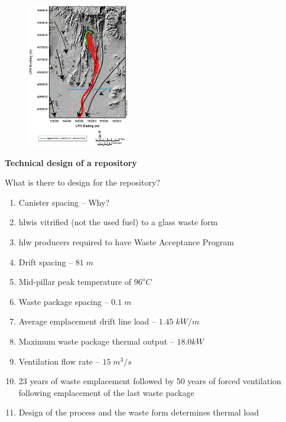 \documentclass[aspectratio=1610,pdftex,dvipsnames,compress,xcolor={dvipsnames}]{beamer}
\newcommand{\acs}{\acrshort} %
\begin{document}
\begin{frame}{}
    \begin{figure}
        \centering
        \includegraphics[width=0.40\textwidth]{groundwater.flow.jpg}
    \end{figure}
\end{frame}


\begin{frame}[plain]{}
    \centering\Large\textbf{Technical design of a repository}
\end{frame}


\addtocounter{framenumber}{-1} 
\begin{frame}{What is there to design for the repository?}
    \begin{enumerate}[series=outerlist,topsep=0pt,itemsep=7pt,leftmargin=*,label=(\arabic*)]
        \item[]Canister spacing -- Why?
        \item[]\acs{hlw}is vitrified (not the used fuel) to a glass waste form
        \item[]\acs{hlw} producers required to have Waste Acceptance Program 
        \item[]Drift spacing -- $81 \; m$
        \item[]Mid-pillar peak temperature of $96^oC$
        \item[]Waste package spacing -- $0.1 \; m$
        \item[]Average emplacement drift line load -- $1.45 \; kW/m$
        \item[]Maximum waste package thermal output -- $18.0 kW$
        \item[]Ventilation flow rate -- $15 \; m^3/s$
        \item[]23 years of waste emplacement followed by 50 years of forced ventilation following emplacement of the last waste package
        \item[]Design of the process and the waste form determines thermal load
    \end{enumerate}
\end{frame}
\end{document}
